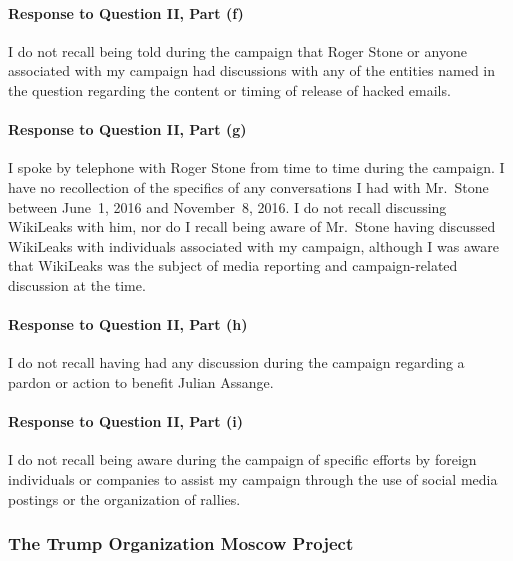 \paragraph*{Response to Question II, Part (f)}

I do not recall being told during the campaign that Roger Stone or anyone associated with my campaign had discussions with any of the entities named in the question regarding the content or timing of release of hacked emails.

\paragraph*{Response to Question II, Part (g)}

I spoke by telephone with Roger Stone from time to time during the campaign.
I have no recollection of the specifics of any conversations I had with Mr.~Stone between June~1, 2016 and November~8, 2016.
I do not recall discussing WikiLeaks with him, nor do I recall being aware of Mr.~Stone having discussed WikiLeaks with individuals associated with my campaign, although I was aware that WikiLeaks was the subject of media reporting and campaign-related discussion at the time.

\paragraph*{Response to Question II, Part (h)}

I do not recall having had any discussion during the campaign regarding a pardon or action to benefit Julian Assange.

\paragraph*{Response to Question II, Part (i)}

I do not recall being aware during the campaign of specific efforts by foreign individuals or companies to assist my campaign through the use of social media postings or the organization of rallies.

\subsubsection{The Trump Organization Moscow Project}

